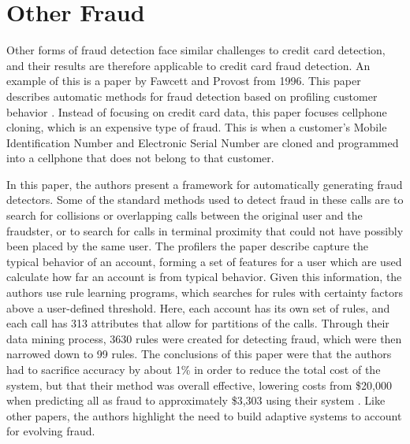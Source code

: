 \documentclass[midd]{thesis}
\begin{document}
\section{Other Fraud}

Other forms of fraud detection face similar challenges to credit card detection, and their results are therefore applicable to credit card fraud detection. An example of this is a paper by Fawcett and Provost from 1996. This paper describes automatic methods for fraud detection based on profiling customer behavior \cite{Fawcett1996}. Instead of focusing on credit card data, this paper focuses cellphone cloning, which is an expensive type of fraud. This is when a customer's Mobile Identification Number and Electronic Serial Number are cloned and programmed into a cellphone that does not belong to that customer. 

In this paper, the authors present a framework for automatically generating fraud detectors. Some of the standard methods used to detect fraud in these calls are to search for collisions or overlapping calls between the original user and the fraudster, or to search for calls in terminal proximity that could not have possibly been placed by the same user. The profilers the paper describe capture the typical behavior of an account, forming a set of features for a user which are used calculate how far an account is from typical behavior. Given this information, the authors use rule learning programs, which searches for rules with certainty factors above a user-defined threshold. Here, each account has its own set of rules, and each call has 313 attributes that allow for partitions of the calls. Through their data mining process, 3630 rules were created for detecting fraud, which were then narrowed down to 99 rules. The conclusions of this paper were that the authors had to sacrifice accuracy by about 1\% in order to reduce the total cost of the system, but that their method was overall effective, lowering costs from \$20,000 when predicting all as fraud to approximately \$3,303 using their system \cite{Fawcett1996}. Like other papers, the authors highlight the need to build adaptive systems to account for evolving fraud.
\end{document}
